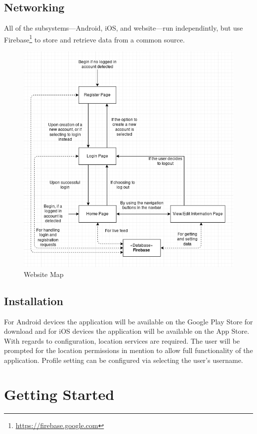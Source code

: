 \documentclass[11pt]{article}
\begin{document}
\subsection{Networking}
All of the subsystems---Android, iOS, and website---run independintly, but use Firebase\footnote{\url{https://firebase.google.com}} to store and retrieve data from a common source.

\begin{figure}
 \centering
 \includegraphics[width=12cm, keepaspectratio]{Images/Map.png}
 \caption{Website Map}
 \label{WebsiteMap}
\end{figure}

\subsection{Installation}
For Android devices the application will be available on the Google Play Store for download and for iOS devices the application will be available on the App Store.\\
With regards to configuration, location services are required. The user will be prompted for the location permissions in mention to allow full functionality of the application. Profile setting can be configured via selecting the user's username.\\

\newpage
\section{Getting Started}
\end{document}
